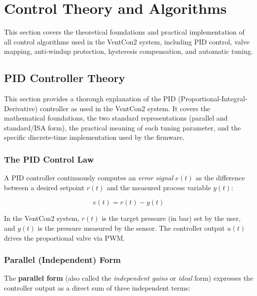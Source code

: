 
\section{Control Theory and Algorithms}
\label{sec:control-theory}

This section covers the theoretical foundations and practical implementation of all control algorithms used in the VentCon2 system, including PID control, valve mapping, anti-windup protection, hysteresis compensation, and automatic tuning.

\subsection{PID Controller Theory}
\label{sec:pid-theory}

This section provides a thorough explanation of the PID (Proportional-Integral-Derivative) controller as used in the VentCon2 system. It covers the mathematical foundations, the two standard representations (parallel and standard/ISA form), the practical meaning of each tuning parameter, and the specific discrete-time implementation used by the firmware.

\subsubsection{The PID Control Law}

A PID controller continuously computes an \emph{error signal} $e(t)$ as the difference between a desired setpoint $r(t)$ and the measured process variable $y(t)$:

\begin{equation}
    e(t) = r(t) - y(t)
\end{equation}

In the VentCon2 system, $r(t)$ is the target pressure (in bar) set by the user, and $y(t)$ is the pressure measured by the sensor. The controller output $u(t)$ drives the proportional valve via PWM.

\subsubsection{Parallel (Independent) Form}
\label{sec:parallel-form}

The \textbf{parallel form} (also called the \emph{independent gains} or \emph{ideal} form) expresses the controller output as a direct sum of three independent terms:

